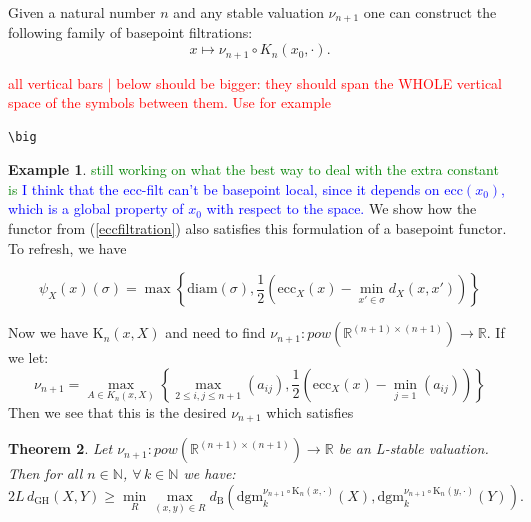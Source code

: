 \documentclass[a4paper,12pt,reqno, english]{amsart}
\newcommand{\dgh}{d_{\mathrm{GH}}}
\newcommand{\dB}{d_{\mathrm{B}}}
\newcommand{\cset}{\mathrm{K}}
\newcommand{\dgm}{\mathrm{dgm}}
\newcommand{\diam}{\mathrm{diam}}
\newcommand{\ecc}{\mathrm{ecc}}
\newcommand{\R}{\mathbb{R}}
\theoremstyle{plain}
\newtheorem{thm}{Theorem}[section]
\theoremstyle{definition}
\newtheorem{ex}[thm]{Example}
\newcommand{\facundo}[1]{\textcolor{red}{#1}}
\newcommand{\jose}[1]{\textcolor{blue}{#1} }
\newcommand{\nate}[1]{\textcolor{green}{#1} }
\begin{document}
Given a natural number $n$ and any stable valuation $\nu_{n+1}$ one can construct the following family of basepoint filtrations:
$$x\mapsto \nu_{n+1}\circ K_n(x_0,\cdot).$$


\facundo{all vertical bars $|$ below should be bigger: they should span the WHOLE vertical space of the symbols between them. Use for example} \begin{verbatim}\big\end{verbatim}

\begin{ex}
\nate{still working on what the best way to deal with the extra constant is}
\jose{I think that the ecc-filt can't be basepoint local, since it depends on $\ecc(x_0)$, which is a global property of $x_0$ with respect to the space.}
We show how the functor from (\ref{eccfiltration}) also satisfies this formulation of a basepoint functor. To refresh, we have 

$$\psi_X(x)(\sigma) = \max\left\{\diam(\sigma),\frac{1}{2}\left(\ecc_X(x)-\min_{x'\in \sigma}d_X(x,x')\right)\right\}$$

Now we have $\cset_n(x,X)$ and need to find $\nu_{n+1}:pow(\mathbb{R}^{(n+1) \times (n+1)})\rightarrow \mathbb{R}$. If we let:\\
$$\nu_{n+1} = \max_{A\in K_n(x,X)}\left\{\max_{2\leq i,j\leq n+1}(a_{ij}),\frac{1}{2}\left(\ecc_X(x)-\min_{j=1}(a_{ij})\right)\right\}$$
Then we see that this is the desired $\nu_{n+1}$ which satisfies 

\end{ex}

\begin{thm}
\label{thm:kn-local}
Let $\nu_{n+1}:pow(\R^{(n+1)\times(n+1)})\rightarrow \R$ be an L-stable valuation. Then for all $n \in \mathbb{N}$, $\forall\, k \in \mathbb{N}$ we have: $$2L\,\dgh(X,Y) \geq \min_{R}\max_{(x,y)\in R}\dB\left( \dgm_{k}^{\nu_{n+1} \circ \cset_n(x,\cdot)}(X),\dgm_{k}^{\nu_{n+1} \circ \cset_n(y,\cdot)}(Y) \right).$$

\end{thm}
\end{document}

